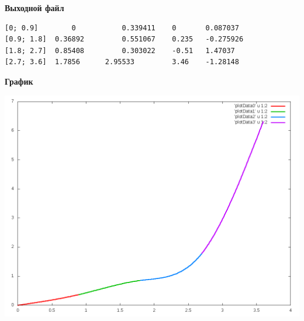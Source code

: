 \textbf{Выходной файл}
\begin{verbatim}
[0; 0.9]		0 			0.339411 	0 		0.087037 
[0.9; 1.8]	0.36892 		0.551067 	0.235 	-0.275926 
[1.8; 2.7]	0.85408 		0.303022 	-0.51 	1.47037 
[2.7; 3.6]	1.7856 		2.95533 		3.46 	-1.28148
\end{verbatim}

\textbf{График}

\begin{center}
\includegraphics[scale=0.5]{images/graphic3_2.png}
\end{center}

\pagebreak
